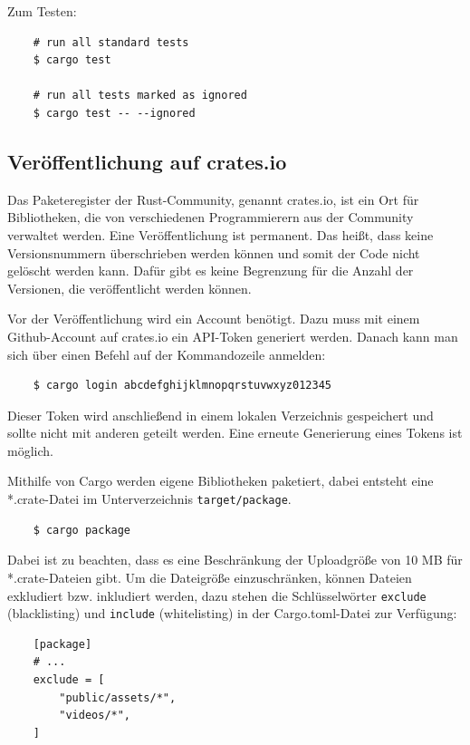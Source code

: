 \newpage

\noindent Zum Testen:

\begin{lstlisting}
    # run all standard tests
    $ cargo test

    # run all tests marked as ignored
    $ cargo test -- --ignored
\end{lstlisting}

\subsection{Veröffentlichung auf crates.io}

Das Paketeregister der Rust-Community, genannt crates.io, ist ein Ort für Bibliotheken, die von verschiedenen Programmierern aus der Community verwaltet werden. Eine Veröffentlichung ist permanent. Das heißt, dass keine Versionsnummern überschrieben werden können und somit der Code nicht gelöscht werden kann. Dafür gibt es keine Begrenzung für die Anzahl der Versionen, die veröffentlicht werden können.

Vor der Veröffentlichung wird ein Account benötigt. Dazu muss mit einem Github-Account auf crates.io ein API-Token generiert werden. Danach kann man sich über einen Befehl auf der Kommandozeile anmelden:

\begin{lstlisting}
    $ cargo login abcdefghijklmnopqrstuvwxyz012345
\end{lstlisting}

Dieser Token wird anschließend in einem lokalen Verzeichnis gespeichert und sollte nicht mit anderen geteilt werden. Eine erneute Generierung eines Tokens ist möglich.

Mithilfe von Cargo werden eigene Bibliotheken paketiert, dabei entsteht eine *.crate-Datei im Unterverzeichnis \verb"target/package".

\begin{lstlisting}
    $ cargo package
\end{lstlisting}

Dabei ist zu beachten, dass es eine Beschränkung der Uploadgröße von 10 MB für *.crate-Dateien gibt. Um die Dateigröße einzuschränken, können Dateien exkludiert bzw. inkludiert werden, dazu stehen die Schlüsselwörter \verb"exclude" (blacklisting) und \verb"include" (whitelisting) in der Cargo.toml-Datei zur Verfügung:

\begin{lstlisting}
    [package]
    # ...
    exclude = [
        "public/assets/*",
        "videos/*",
    ]
\end{lstlisting}


